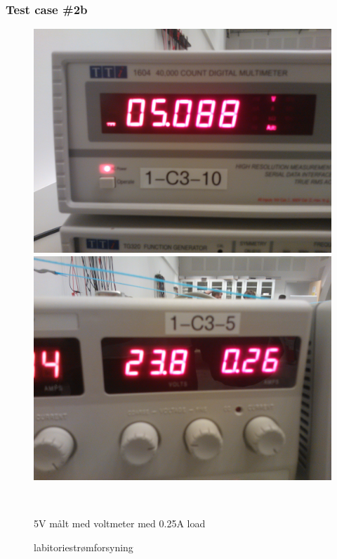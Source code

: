 \subsubsection{Test case \#2b}
\begin{figure}[htbp] \centering
\begin{minipage}[c]{0.48\textwidth} \centering
\includegraphics[width=1.00\textwidth]{billeder/5V_025A_meter.jpg} 
\end{minipage} \hfill
\begin{minipage}[c]{0.48\textwidth} \centering
\includegraphics[width=1.00\textwidth]{billeder/5V_025A_power.jpg} 
\end{minipage} \\ 
\begin{minipage}[b]{0.48\textwidth}
\caption{5V målt med voltmeter med 0.25A load} 
\label{fig:udgang_5V_05A}
\end{minipage} \hfill
\begin{minipage}[b]{0.48\textwidth}
\caption{labitoriestrømforsyning} 
\label{fig:forsyning_5V_05A}
\end{minipage}
\end{figure}
